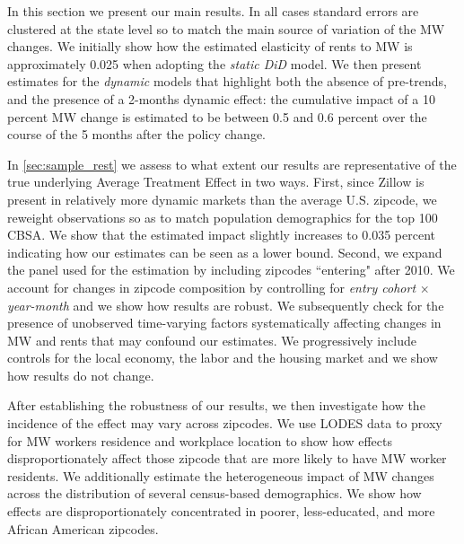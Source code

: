 
In this section we present our main results. In all cases standard errors are clustered at the 
state level so to match the main source of variation of the MW changes. We initially show how the 
estimated elasticity of rents to MW is approximately 0.025 when adopting the \textit{static DiD} 
model. We then present estimates for the \textit{dynamic} models that highlight both the absence 
of pre-trends, and the presence of a 2-months dynamic effect: the cumulative impact of a 10 percent MW 
change is estimated to be between 0.5 and 0.6 percent over the course of the 5 months after the policy 
change.

In \autoref{sec:sample_rest} we assess to what extent our results are representative of the true 
underlying Average Treatment Effect in two ways. First, since Zillow is present in relatively more 
dynamic markets than the average U.S. zipcode, we reweight observations so as to match population 
demographics for the top 100 CBSA. We show that the estimated impact slightly increases to 0.035 
percent indicating how our estimates can be seen as a lower bound. Second, we expand the panel used 
for the estimation by including zipcodes ``entering" after 2010. We account for changes in zipcode 
composition by controlling for \textit{entry cohort} $\times$ \textit{year-month} and we show how 
results are robust. We subsequently check for the presence of unobserved time-varying factors 
systematically affecting changes in MW and rents that may confound our estimates. We progressively 
include controls for the local economy, the labor and the housing market and we show how results 
do not change.

After establishing the robustness of our results, we then investigate how the incidence of the 
effect may vary across zipcodes. We use LODES data to proxy for MW workers residence and workplace 
location to show how effects disproportionately affect those zipcode that are more likely to have 
MW worker residents. We additionally estimate the heterogeneous impact of MW changes across the 
distribution of several census-based demographics. We show how effects are disproportionately 
concentrated in poorer, less-educated, and more African American zipcodes.


